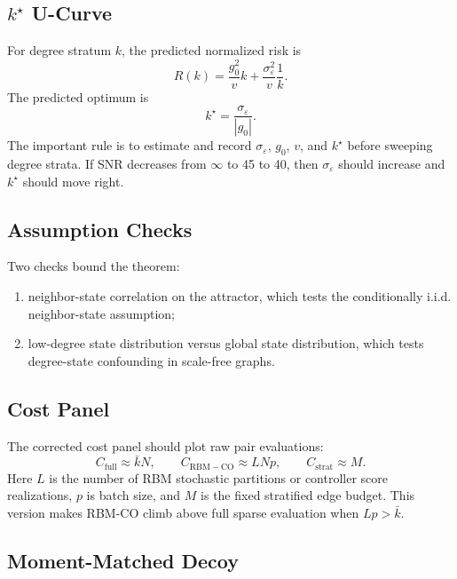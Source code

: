 \documentclass[11pt]{article}
\begin{document}
\subsection{$k^\star$ U-Curve}

For degree stratum $k$, the predicted normalized risk is
\begin{equation}
    R(k)
    =
    \frac{g_0^2}{v}k
    +
    \frac{\sigma_\varepsilon^2}{v}\frac{1}{k}.
\end{equation}
The predicted optimum is
\begin{equation}
    k^\star
    =
    \frac{\sigma_\varepsilon}{|g_0|}.
\end{equation}
The important rule is to estimate and record
$\sigma_\varepsilon$, $g_0$, $v$, and $k^\star$ before sweeping degree strata.
If SNR decreases from $\infty$ to 45 to 40, then
$\sigma_\varepsilon$ should increase and $k^\star$ should move right.

\subsection{Assumption Checks}

Two checks bound the theorem:
\begin{enumerate}
    \item neighbor-state correlation on the attractor, which tests the
    conditionally i.i.d. neighbor-state assumption;
    \item low-degree state distribution versus global state distribution, which
    tests degree-state confounding in scale-free graphs.
\end{enumerate}

\subsection{Cost Panel}

The corrected cost panel should plot raw pair evaluations:
\begin{equation}
    C_{\mathrm{full}}\approx \bar{k}N,\qquad
    C_{\mathrm{RBM-CO}}\approx L N p,\qquad
    C_{\mathrm{strat}}\approx M.
\end{equation}
Here $L$ is the number of RBM stochastic partitions or controller score
realizations, $p$ is batch size, and $M$ is the fixed stratified edge budget.
This version makes RBM-CO climb above full sparse evaluation when $Lp>\bar{k}$.

\subsection{Moment-Matched Decoy}
\end{document}
